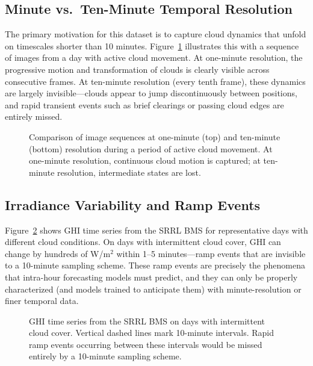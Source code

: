 \documentclass[twoside,11pt]{article}
\begin{document}
\subsection{Minute vs.\ Ten-Minute Temporal Resolution}

The primary motivation for this dataset is to capture cloud dynamics that unfold on timescales shorter than 10 minutes. Figure~\ref{fig:1v10} illustrates this with a sequence of images from a day with active cloud movement. At one-minute resolution, the progressive motion and transformation of clouds is clearly visible across consecutive frames. At ten-minute resolution (every tenth frame), these dynamics are largely invisible---clouds appear to jump discontinuously between positions, and rapid transient events such as brief clearings or passing cloud edges are entirely missed.

\begin{figure}[t]
    \centering
    \caption{Comparison of image sequences at one-minute (top) and ten-minute (bottom) resolution during a period of active cloud movement. At one-minute resolution, continuous cloud motion is captured; at ten-minute resolution, intermediate states are lost.}
    \label{fig:1v10}
\end{figure}

\subsection{Irradiance Variability and Ramp Events}

Figure~\ref{fig:ramps} shows GHI time series from the SRRL BMS for representative days with different cloud conditions. On days with intermittent cloud cover, GHI can change by hundreds of W/m$^2$ within 1--5 minutes---ramp events that are invisible to a 10-minute sampling scheme. These ramp events are precisely the phenomena that intra-hour forecasting models must predict, and they can only be properly characterized (and models trained to anticipate them) with minute-resolution or finer temporal data.

\begin{figure}[t]
    \centering
    \caption{GHI time series from the SRRL BMS on days with intermittent cloud cover. Vertical dashed lines mark 10-minute intervals. Rapid ramp events occurring between these intervals would be missed entirely by a 10-minute sampling scheme.}
    \label{fig:ramps}
\end{figure}
\end{document}
